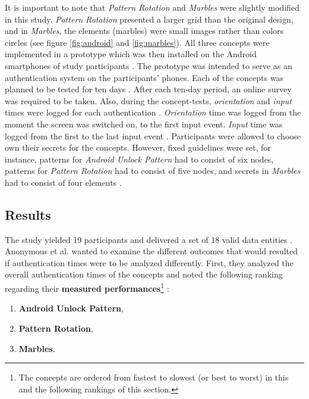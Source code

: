 It is important to note that \textit{Pattern Rotation} and \textit{Marbles} \cite{Marbles} were slightly modified in this study. \textit{Pattern Rotation} presented a larger grid than the original design, and in \textit{Marbles}, the elements (marbles) were small images rather than colors circles (see figure \ref{fig:android} and \ref{fig:marbles}). All three concepts were implemented in a prototype which was then installed on the Android smartphones of study participants \cite{anonymous}. The prototype was intended to serve as an authentication system on the participants' phones. Each of the concepts was planned to be tested for ten days \cite{anonymous}. After each ten-day period, an online survey was required to be taken. Also, during the concept-tests, \textit{orientation} and \textit{input} times were logged for each authentication \cite{anonymous}. \textit{Orientation} time was logged from the moment the screen was switched on, to the first input event. \textit{Input} time was logged from the first to the last input event \cite{anonymous}. Participants were allowed to choose own their secrets for the concepts. However, fixed guidelines were set, for instance, patterns for \textit{Android Unlock Pattern} had to consist of six nodes, patterns for \textit{Pattern Rotation} had to consist of five nodes, and secrets in \textit{Marbles} had to consist of four elements \cite{anonymous}.

\subsection{Results}

The study yielded 19 participants and delivered a set of 18 valid data entities \cite{anonymous}. Anonymous et al. \cite{anonymous} wanted to examine the different outcomes that would resulted if authentication times were to be analyzed differently. First, they analyzed the overall authentication times of the concepts and noted the following ranking regarding their \textbf{measured performances}\footnote{The concepts are ordered from fastest to slowest (or best to worst) in this and the following rankings of this section.} \cite{anonymous}:

\begin{enumerate}
    \item \textbf{Android Unlock Pattern},
    \item \textbf{Pattern Rotation},
    \item \textbf{Marbles}.
\end{enumerate} 

